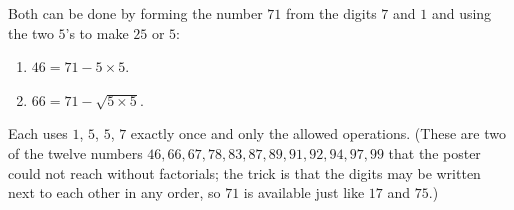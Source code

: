 Both can be done by forming the number $71$ from the digits $7$ and $1$ and using the two $5$'s to make $25$ or $5$:
\begin{enumerate}
\item[(a)] $46=71-5\times5$.
\item[(b)] $66=71-\sqrt{5\times5}$.
\end{enumerate}
Each uses $1$, $5$, $5$, $7$ exactly once and only the allowed operations. (These are two of the twelve numbers $46, 66, 67, 78, 83, 87, 89, 91, 92, 94, 97, 99$ that the poster could not reach without factorials; the trick is that the digits may be written next to each other in any order, so $71$ is available just like $17$ and $75$.)
